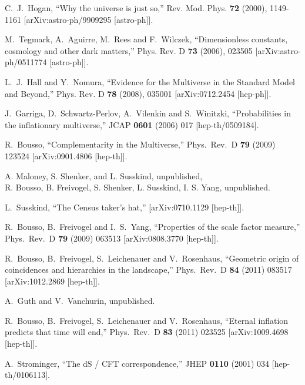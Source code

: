 \documentclass[12pt]{article}
\numberwithin{equation}{section}
\begin{document}
\begin{thebibliography}{999}
C.~J.~Hogan, ``Why the universe is just so,''
Rev. Mod. Phys. \textbf{72} (2000), 1149-1161
[arXiv:astro-ph/9909295 [astro-ph]].
  
M.~Tegmark, A.~Aguirre, M.~Rees and F.~Wilczek,
``Dimensionless constants, cosmology and other dark matters,''
Phys. Rev. D \textbf{73} (2006), 023505
[arXiv:astro-ph/0511774 [astro-ph]]. 
  
L.~J.~Hall and Y.~Nomura,
``Evidence for the Multiverse in the Standard Model and Beyond,'' Phys. Rev. D \textbf{78} (2008), 035001
[arXiv:0712.2454 [hep-ph]].
  
  J.~Garriga, D.~Schwartz-Perlov, A.~Vilenkin and S.~Winitzki,
  ``Probabilities in the inflationary multiverse,''
  JCAP {\bf 0601} (2006) 017
  [hep-th/0509184].

  R.~Bousso, ``Complementarity in the Multiverse,''
  Phys.\ Rev.\ D {\bf 79} (2009) 123524
  [arXiv:0901.4806 [hep-th]].

A. Maloney, S. Shenker, and L. Susskind, unpublished,\\
R. Bousso, B. Freivogel, S. Shenker, L. Susskind, I. S. Yang, unpublished.
  
L.~Susskind,
``The Census taker's hat,''
[arXiv:0710.1129 [hep-th]].

  R.~Bousso, B.~Freivogel and I.~S.~Yang,
  ``Properties of the scale factor measure,''
  Phys.\ Rev.\ D {\bf 79} (2009) 063513
  [arXiv:0808.3770 [hep-th]].
  
  R.~Bousso, B.~Freivogel, S.~Leichenauer and V.~Rosenhaus,
  ``Geometric origin of coincidences and hierarchies in the landscape,''
  Phys.\ Rev.\ D {\bf 84} (2011) 083517
  [arXiv:1012.2869 [hep-th]].
  
  A.~Guth and V.~Vanchurin, unpublished.

  R.~Bousso, B.~Freivogel, S.~Leichenauer and V.~Rosenhaus,
  ``Eternal inflation predicts that time will end,''
  Phys.\ Rev.\ D {\bf 83} (2011) 023525
  [arXiv:1009.4698 [hep-th]].
  
  A.~Strominger,
  ``The dS / CFT correspondence,''
  JHEP {\bf 0110} (2001) 034 [hep-th/0106113].
  

\end{thebibliography}
\end{document}
